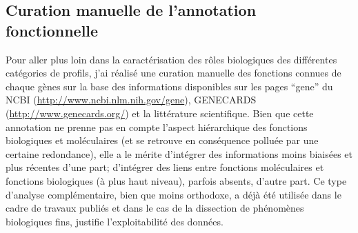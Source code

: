\documentclass[../main.tex]{subfiles}
\begin{document}
\subsection{Curation manuelle de l'annotation fonctionnelle}\label{subsec:manual-annot}
Pour aller plus loin dans la caractérisation des rôles biologiques des différentes catégories de profils, j'ai réalisé une curation manuelle des fonctions connues de chaque gènes sur la base des informations disponibles sur les pages ``gene'' du NCBI (\url{http://www.ncbi.nlm.nih.gov/gene}), GENECARDS (\url{http://www.genecards.org/}) et la littérature scientifique.
Bien que cette annotation ne prenne pas en compte l'aspect hiérarchique des fonctions biologiques et moléculaires (et se retrouve en conséquence polluée par une certaine redondance), elle a le mérite d'intégrer des informations moins biaisées et plus récentes d'une part; d'intégrer des liens entre fonctions moléculaires et fonctions biologiques (à plus haut niveau), parfois absents, d'autre part.
Ce type d'analyse complémentaire, bien que moins orthodoxe, a déjà été utilisée dans le cadre de travaux publiés \citep{Hendrix2008} et dans le cas de la dissection de phénomènes biologiques fins, justifie l'exploitabilité des données.
\end{document}
